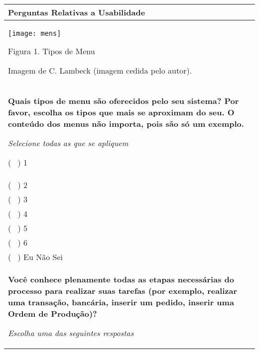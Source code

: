 \bigskip

\noindent  \begin{longtable}{|p{15.7cm}|}
	\hline
	\tabitem \textbf{Perguntas Relativas a Usabilidade} \\
	\hline
	\begin{Spacing}{1.8} 
	\parbox[c]{1em}{\texttt{[image: mens]}} 
	\end{Spacing} 
	\begin{Spacing}{1.2} 
		\hspace{6} Figura 1. Tipos de Menu 
		\end{Spacing}
	\tiny \hspace{6} Imagem de C. Lambeck (imagem cedida pelo autor). \\
	\begin{Spacing}{0.8} 
	\textbf{Quais tipos de menu são oferecidos pelo seu sistema? Por favor, escolha os tipos que mais se aproximam do seu. O conteúdo dos menus não importa, pois são só um exemplo.} \end{Spacing} 	\begin{Spacing}{2.0} 
		\tiny \textit{Selecione todas as que se apliquem} \end{Spacing} 
	( \ ) 1 \\
	( \ ) 2 \\
	( \ ) 3 \\
	( \ ) 4 \\
	( \ ) 5 \\
	( \ ) 6 \\
	( \ ) Eu Não Sei \\
	\begin{Spacing}{0.8} \end{Spacing}
	\begin{Spacing}{0.8} 
		\textbf{Você conhece plenamente todas as etapas necessárias do processo para realizar suas tarefas (por exemplo, realizar uma transação, bancária, inserir um pedido, inserir uma Ordem de Produção)?} \end{Spacing} 
	\begin{Spacing}{2.0} 
		\tiny \textit{Escolha uma das seguintes respostas} \end{Spacing} 

\end{longtable}
